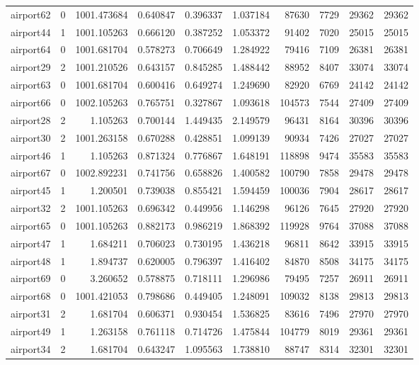 \documentclass[../../../thesis.tex]{subfiles}
\begin{document}
\begin{longtable}{|l|r|r|r|r|r|r|r|r|r|}
airport62 & 0 & 1001.473684 & 0.640847 & 0.396337 & 1.037184 & 87630 & 7729 & 29362 & 29362 \\
airport44 & 1 & 1001.105263 & 0.666120 & 0.387252 & 1.053372 & 91402 & 7020 & 25015 & 25015 \\
airport64 & 0 & 1001.681704 & 0.578273 & 0.706649 & 1.284922 & 79416 & 7109 & 26381 & 26381 \\
airport29 & 2 & 1001.210526 & 0.643157 & 0.845285 & 1.488442 & 88952 & 8407 & 33074 & 33074 \\
airport63 & 0 & 1001.681704 & 0.600416 & 0.649274 & 1.249690 & 82920 & 6769 & 24142 & 24142 \\
airport66 & 0 & 1002.105263 & 0.765751 & 0.327867 & 1.093618 & 104573 & 7544 & 27409 & 27409 \\
airport28 & 2 & 1.105263 & 0.700144 & 1.449435 & 2.149579 & 96431 & 8164 & 30396 & 30396 \\
airport30 & 2 & 1001.263158 & 0.670288 & 0.428851 & 1.099139 & 90934 & 7426 & 27027 & 27027 \\
airport46 & 1 & 1.105263 & 0.871324 & 0.776867 & 1.648191 & 118898 & 9474 & 35583 & 35583 \\
airport67 & 0 & 1002.892231 & 0.741756 & 0.658826 & 1.400582 & 100790 & 7858 & 29478 & 29478 \\
airport45 & 1 & 1.200501 & 0.739038 & 0.855421 & 1.594459 & 100036 & 7904 & 28617 & 28617 \\
airport32 & 2 & 1001.105263 & 0.696342 & 0.449956 & 1.146298 & 96126 & 7645 & 27920 & 27920 \\
airport65 & 0 & 1001.105263 & 0.882173 & 0.986219 & 1.868392 & 119928 & 9764 & 37088 & 37088 \\
airport47 & 1 & 1.684211 & 0.706023 & 0.730195 & 1.436218 & 96811 & 8642 & 33915 & 33915 \\
airport48 & 1 & 1.894737 & 0.620005 & 0.796397 & 1.416402 & 84870 & 8508 & 34175 & 34175 \\
airport69 & 0 & 3.260652 & 0.578875 & 0.718111 & 1.296986 & 79495 & 7257 & 26911 & 26911 \\
airport68 & 0 & 1001.421053 & 0.798686 & 0.449405 & 1.248091 & 109032 & 8138 & 29813 & 29813 \\
airport31 & 2 & 1.681704 & 0.606371 & 0.930454 & 1.536825 & 83616 & 7496 & 27970 & 27970 \\
airport49 & 1 & 1.263158 & 0.761118 & 0.714726 & 1.475844 & 104779 & 8019 & 29361 & 29361 \\
airport34 & 2 & 1.681704 & 0.643247 & 1.095563 & 1.738810 & 88747 & 8314 & 32301 & 32301 \\

\end{longtable}
\end{document}
